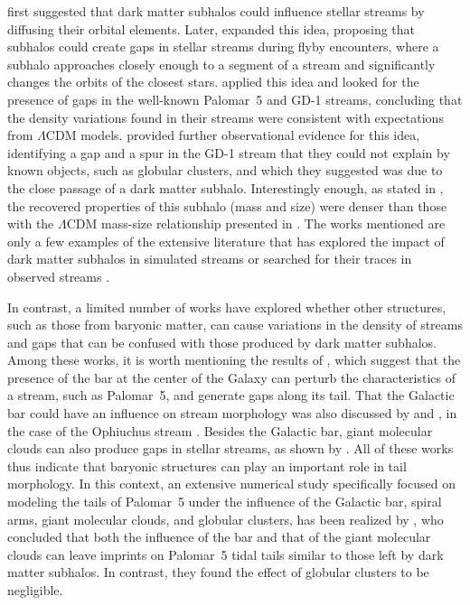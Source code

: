     \citet{2002MNRAS.332..915I} first suggested that dark matter subhalos could influence stellar streams by diffusing their orbital elements. Later, \citet{2012ApJ...748...20C} expanded this idea, proposing that subhalos could create gaps in stellar streams during flyby encounters, where a subhalo approaches closely enough to a segment of a stream and significantly changes the orbits of the closest stars. \citet{2013ApJ...768..171C} applied this idea and looked for the presence of gaps in the well-known Palomar~5 and GD-1 streams, concluding that the density variations found in their streams were consistent with expectations from $\Lambda$CDM models. \citet{2019ApJ...880...38B} provided further observational evidence for this idea, identifying a gap and a spur in the GD-1 stream that they could not explain by known objects, such as globular clusters, and which they suggested was due to the close passage of a dark matter subhalo. Interestingly enough, as stated in \citet{2019ApJ...880...38B}, the recovered properties of this subhalo (mass and size) were denser than those with the $\Lambda$CDM mass-size relationship presented in \cite{2017MNRAS.466.4974M}. The works mentioned are only a few examples of the extensive literature that has explored the impact of dark matter subhalos in simulated streams \citep{2016ApJ...828L..10H, 2021MNRAS.507.1999H, 2021JCAP...10..043B, 2024arXiv240402953H, 2025ApJ...983...68N} or searched for their traces in observed streams \citep{2016MNRAS.460.2711T, 2017MNRAS.470...60E, 2020ApJ...889...70B, 2020ApJ...892L..37B}.

    In contrast, a limited number of works have explored whether other structures, such as those from baryonic matter, can cause variations in the density of streams and gaps that can be confused with those produced by dark matter subhalos.  Among these works, it is worth mentioning the results of \citet{2017NatAs...1..633P}, which suggest that the presence of the bar at the center of the Galaxy can perturb the characteristics of a stream, such as Palomar~5, and generate gaps along its tail. That the Galactic bar could have an influence on stream morphology was also discussed by \citet{2016MNRAS.460..497H} and \citet{2016ApJ...824..104P}, in the case of the Ophiuchus stream \citep{2014MNRAS.443L..84B}. Besides the Galactic bar, giant molecular clouds can also produce gaps in stellar streams, as shown by \citet{2016MNRAS.463L..17A}. All of these works thus indicate that baryonic structures can play an important role in tail morphology. In this context,  an extensive numerical study specifically focused on modeling the tails of Palomar~5 under the influence of the Galactic bar, spiral arms, giant molecular clouds, and globular clusters, has been realized by \citet{2019MNRAS.484.2009B}, who concluded that both the influence of the bar and that of the giant molecular clouds can leave imprints on Palomar~5 tidal tails similar to those left by dark matter subhalos. In contrast, they found the effect of globular clusters to be negligible. 


